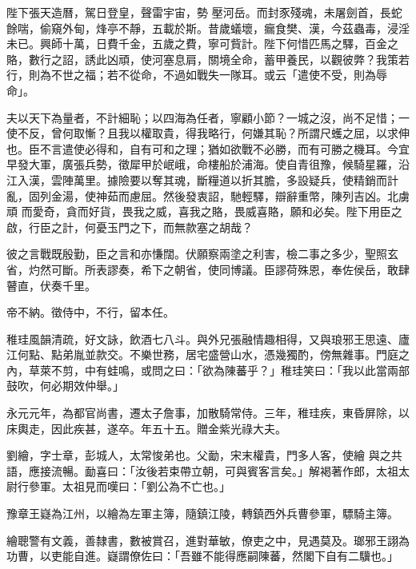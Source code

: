 \begin{pinyinscope}
 陛下張天造曆，駕日登皇，聲雷宇宙，勢
 壓河岳。而封豕殘魂，未屠劍首，長蛇餘喘，偷窺外甸，烽亭不靜，五載於斯。昔歲蟻壞，瘺食樊、漢，今茲蟲毒，浸淫未已。興師十萬，日費千金，五歲之費，寧可貲計。陛下何惜匹馬之驛，百金之賂，數行之詔，誘此凶頑，使河塞息肩，關境全命，蓄甲養民，以觀彼弊？我策若行，則為不世之福；若不從命，不過如戰失一隊耳。或云「遣使不受，則為辱命」。



 夫以天下為量者，不計細恥；以四海為任者，寧顧小節？一城之沒，尚不足惜；一使不反，曾何取慚？且我以權取貴，得我略行，何嫌其恥？所謂尺蠖之屈，以求伸也。臣不言遣使必得和，自有可和之理；猶如欲戰不必勝，而有可勝之機耳。今宜早發大軍，廣張兵勢，徵犀甲於岷峨，命樓船於浦海。使自青徂豫，候騎星羅，沿江入漢，雲陣萬里。據險要以奪其魂，斷糧道以折其膽，多設疑兵，使精銷而計亂，固列金湯，使神茹而慮屈。然後發衷詔，馳輕驛，辯辭重幣，陳列吉凶。北虜頑
 而愛奇，貪而好貨，畏我之威，喜我之賂，畏威喜賂，願和必矣。陛下用臣之啟，行臣之計，何憂玉門之下，而無款塞之胡哉？



 彼之言戰既殷勤，臣之言和亦慊闊。伏願察兩塗之利害，檢二事之多少，聖照玄省，灼然可斷。所表謬奏，希下之朝省，使同博議。臣謬荷殊恩，奉佐侯岳，敢肆瞽直，伏奏千里。



 帝不納。徵侍中，不行，留本任。



 稚珪風韻清疏，好文詠，飲酒七八斗。與外兄張融情趣相得，又與琅邪王思遠、廬江何點、點弟胤並款交。不樂世務，居宅盛營山水，憑幾獨酌，傍無雜事。門庭之內，草萊不剪，中有蛙鳴，或問之曰：「欲為陳蕃乎？」稚珪笑曰：「我以此當兩部鼓吹，何必期效仲舉。」



 永元元年，為都官尚書，遷太子詹事，加散騎常侍。三年，稚珪疾，東昏屏除，以床輿走，因此疾甚，遂卒。年五十五。贈金紫光祿大夫。



 劉繪，字士章，彭城人，太常悛弟也。父勔，宋末權貴，門多人客，使繪
 與之共語，應接流暢。勔喜曰：「汝後若束帶立朝，可與賓客言矣。」解褐著作郎，太祖太尉行參軍。太祖見而嘆曰：「劉公為不亡也。」



 豫章王嶷為江州，以繪為左軍主簿，隨鎮江陵，轉鎮西外兵曹參軍，驃騎主簿。



 繪聰警有文義，善隸書，數被賞召，進對華敏，僚吏之中，見遇莫及。瑯邪王詡為功曹，以吏能自進。嶷謂僚佐曰：「吾雖不能得應嗣陳蕃，然閣下自有二驥也。」




\end{pinyinscope}
